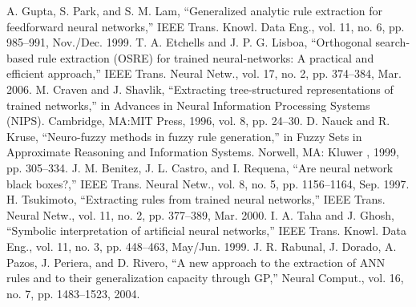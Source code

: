 \documentclass[a4paper,14pt,onecolumn]{article}
\begin{document}
\begin{thebibliography}{00}
 A. Gupta, S. Park, and S. M. Lam, “Generalized analytic rule extraction for feedforward neural networks,” IEEE Trans. Knowl. Data Eng., vol. 11, no. 6, pp. 985–991, Nov./Dec. 1999.
 T. A. Etchells and J. P. G. Lisboa, “Orthogonal search-based rule extraction (OSRE) for trained neural-networks: A  practical and efficient approach,” IEEE Trans. Neural Netw., vol. 17, no. 2, pp. 374–384, Mar. 2006.
 M. Craven and J. Shavlik, “Extracting tree-structured representations of trained networks,” in Advances in Neural Information Processing Systems (NIPS). Cambridge, MA:MIT Press, 1996, vol. 8, pp. 24–30.
 D. Nauck and R. Kruse, “Neuro-fuzzy methods in fuzzy rule generation,” in Fuzzy Sets in Approximate Reasoning and Information Systems. Norwell, MA: Kluwer , 1999, pp. 305–334.
 J. M. Benitez, J. L. Castro, and I. Requena, “Are neural network black boxes?,” IEEE Trans. Neural Netw., vol. 8, no. 5, pp. 1156–1164, Sep. 1997.
 H. Tsukimoto, “Extracting rules from trained neural networks,” IEEE Trans. Neural Netw., vol. 11, no. 2, pp. 377–389, Mar. 2000. 
 I. A. Taha and J. Ghosh, “Symbolic interpretation of artificial neural networks,” IEEE Trans. Knowl. Data Eng., vol. 11, no. 3, pp. 448–463, May/Jun. 1999.
 J. R. Rabunal, J. Dorado, A. Pazos, J. Periera, and D. Rivero, “A new approach to the extraction of ANN rules and to their generalization capacity through GP,” Neural Comput., vol. 16, no. 7, pp. 1483–1523, 2004. 
\end{thebibliography}
\end{document}
